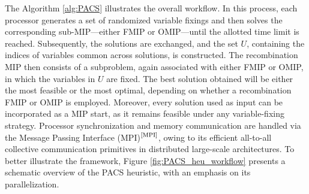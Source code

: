The Algorithm \ref{alg:PACS} illustrates the overall workflow. In this process, each processor generates a set of randomized variable fixings and then solves the corresponding sub-MIP—either FMIP or OMIP—until the allotted time limit is reached.
Subsequently, the solutions are exchanged, and the set $U$, containing the indices of variables common across solutions, is constructed. The recombination MIP then consists of a subproblem, again associated with either FMIP or OMIP, in which the variables in $U$ are fixed.
The best solution obtained will be either the most feasible or the most optimal, depending on whether a recombination FMIP or OMIP is employed. Moreover, every solution used as input can be incorporated as a MIP start, as it remains feasible under any variable-fixing strategy.
Processor synchronization and memory communication are handled via the Message Passing Interface (MPI)$^\text{\cite{MPI}}$, owing to its efficient all-to-all collective communication primitives in distributed large-scale architectures.
To better illustrate the framework, Figure \ref{fig:PACS_heu_workflow} presents a schematic overview of the PACS heuristic, with an emphasis on its parallelization.
